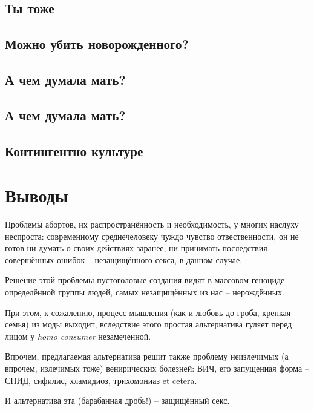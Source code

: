 \documentclass[a4paper,12pt]{report}
\begin{document}
    \section{Ты тоже}
	\section{Можно убить новорожденного?}
	\section{А чем думала мать?}
	\section{А чем думала мать?}
	\section{Контингентно культуре}
	\section{}
	\section{}
    \section{}

\chapter{Выводы}
Проблемы абортов, их распространённость и необходимость, у многих наслуху неспроста: современному среднечеловеку чуждо чувство отвественности, он не готов ни думать о своих действиях заранее, ни принимать последствия совершённых ошибок -- незащищённого секса, в данном случае.

Решение этой проблемы пустоголовые создания видят в массовом геноциде определённой группы людей, самых незащищённых из нас --  нерождённых. 

При этом, к сожалению, процесс мышления (как и любовь до гроба, крепкая семья) из моды выходит, вследствие этого простая альтернатива гуляет перед лицом у \textit{homo consumer} незамеченной. 

Впрочем, предлагаемая альтернатива решит также проблему неизлечимых (а впрочем, излечимых тоже) венирических болезней: ВИЧ, его запущенная форма -- СПИД, сифилис, хламидиоз, трихомониаз et cetera.

И альтернатива эта (барабанная дробь!) -- защищённый секс.
\end{document}
